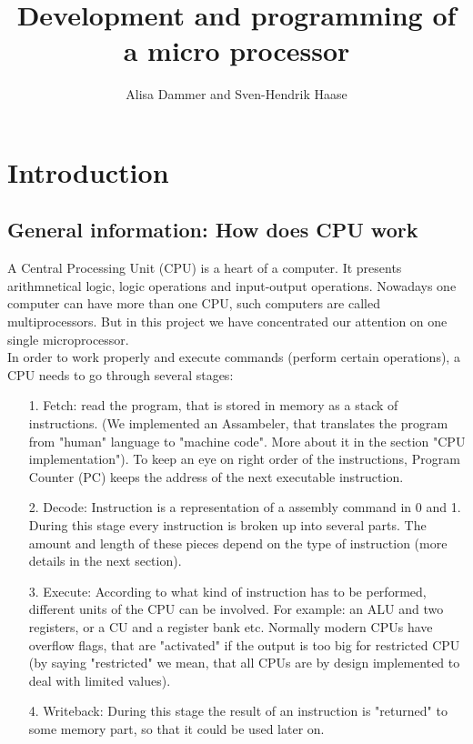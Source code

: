 \documentclass[11pt,a4paper]{article}
\begin{document}
\title{Development and programming of a micro processor}
\author{Alisa Dammer and Sven-Hendrik Haase}
\maketitle

\section{Introduction}
\subsection{General information: How does CPU work}
A Central Processing Unit (CPU) is a heart of a computer. It presents arithmnetical logic, logic operations and input-output operations. Nowadays one computer can have more than one CPU, such computers are called multiprocessors. But in this project we have concentrated our attention on one single microprocessor.\\
In order to work properly and execute commands (perform certain operations), a CPU needs to go through several stages:
\begin{enumerate}
	\item[1.] Fetch: read the program, that is stored in memory as a stack of instructions. (We implemented an Assambeler, that translates the program from "human" language to "machine code". More about it in the section "CPU implementation"). To keep an eye on right order of the instructions, Program Counter (PC) keeps the address of the next executable instruction.
	\item[2.] Decode: Instruction is a representation of a assembly command in 0 and 1. During this stage every instruction is broken up into several parts. The amount and length of these pieces depend on the type of instruction (more details in the next section). 
	\item[3.] Execute: According to what kind of instruction has to be performed, different units of the CPU can be involved. For example: an ALU and two registers, or a CU and a register bank etc. Normally modern CPUs have overflow flags, that are "activated" if the output is too big for restricted CPU (by saying "restricted" we mean, that all CPUs are by design implemented to deal with limited values).
	\item[4.] Writeback: During this stage the result of an instruction is "returned" to some memory part, so that it could be used later on.
\end{enumerate}
\end{document}
